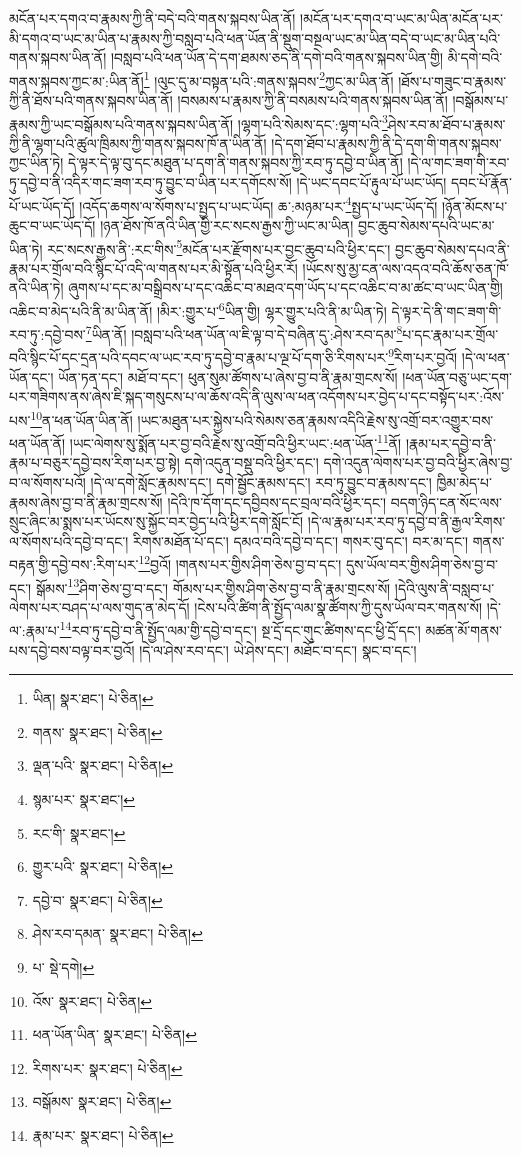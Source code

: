མངོན་པར་དགའ་བ་རྣམས་ཀྱི་ནི་བདེ་བའི་གནས་སྐབས་ཡིན་ནོ། །མངོན་པར་དགའ་བ་ཡང་མ་ཡིན་མངོན་པར་མི་དགའ་བ་ཡང་མ་ཡིན་པ་རྣམས་ཀྱི་བསླབ་པའི་ཕན་ཡོན་ནི་སྡུག་བསྔལ་ཡང་མ་ཡིན་བདེ་བ་ཡང་མ་ཡིན་པའི་གནས་སྐབས་ཡིན་ནོ། །བསླབ་པའི་ཕན་ཡོན་དེ་དག་ཐམས་ཅད་ནི་དགེ་བའི་གནས་སྐབས་ཡིན་གྱི། མི་དགེ་བའི་གནས་སྐབས་ཀྱང་མ་:ཡིན་ནོ།\footnote{ཡིན།  སྣར་ཐང་།  པེ་ཅིན། } །ལུང་དུ་མ་བསྟན་པའི་:གནས་སྐབས་\footnote{གནས་  སྣར་ཐང་།  པེ་ཅིན། }ཀྱང་མ་ཡིན་ནོ། །ཐོས་པ་གཟུང་བ་རྣམས་ཀྱི་ནི་ཐོས་པའི་གནས་སྐབས་ཡིན་ནོ། །བསམས་པ་རྣམས་ཀྱི་ནི་བསམས་པའི་གནས་སྐབས་ཡིན་ནོ། །བསྒོམས་པ་རྣམས་ཀྱི་ཡང་བསྒོམས་པའི་གནས་སྐབས་ཡིན་ནོ། །ལྷག་པའི་སེམས་དང་:ལྷག་པའི་\footnote{ལྡན་པའི་  སྣར་ཐང་།  པེ་ཅིན། }ཤེས་རབ་མ་ཐོབ་པ་རྣམས་ཀྱི་ནི་ལྷག་པའི་ཚུལ་ཁྲིམས་ཀྱི་གནས་སྐབས་ཁོ་ན་ཡིན་ནོ། །དེ་དག་ཐོབ་པ་རྣམས་ཀྱི་ནི་དེ་དག་གི་གནས་སྐབས་ཀྱང་ཡིན་ཏེ། དེ་ལྟར་དེ་ལྟ་བུ་དང་མཐུན་པ་དག་ནི་གནས་སྐབས་ཀྱི་རབ་ཏུ་དབྱེ་བ་ཡིན་ནོ། །དེ་ལ་གང་ཟག་གི་རབ་ཏུ་དབྱེ་བ་ནི་འདིར་གང་ཟག་རབ་ཏུ་བྱུང་བ་ཡིན་པར་དགོངས་སོ། །དེ་ཡང་དབང་པོ་རྟུལ་པོ་ཡང་ཡོད། དབང་པོ་རྣོན་པོ་ཡང་ཡོད་དོ། །འདོད་ཆགས་ལ་སོགས་པ་སྤྱད་པ་ཡང་ཡོད། ཆ་:མཉམ་པར་\footnote{སྙམ་པར་  སྣར་ཐང་། }སྤྱད་པ་ཡང་ཡོད་དོ། །ཉོན་མོངས་པ་ཆུང་བ་ཡང་ཡོད་དོ། །ཉན་ཐོས་ཁོ་ནའི་ཡིན་གྱི་རང་སངས་རྒྱས་ཀྱི་ཡང་མ་ཡིན། བྱང་ཆུབ་སེམས་དཔའི་ཡང་མ་ཡིན་ཏེ། རང་སངས་རྒྱས་ནི་:རང་གིས་\footnote{རང་གི་  སྣར་ཐང་། }མངོན་པར་རྫོགས་པར་བྱང་ཆུབ་པའི་ཕྱིར་དང་། བྱང་ཆུབ་སེམས་དཔའ་ནི་རྣམ་པར་གྲོལ་བའི་སྙིང་པོ་འདི་ལ་གནས་པར་མི་སྟོན་པའི་ཕྱིར་རོ། །ཡོངས་སུ་མྱ་ངན་ལས་འདའ་བའི་ཆོས་ཅན་ཁོ་ནའི་ཡིན་ཏེ། ཞུགས་པ་དང་མ་བསྒྲིབས་པ་དང་འཆིང་བ་མཐའ་དག་ཡོད་པ་དང་འཆིང་བ་མ་ཚང་བ་ཡང་ཡིན་གྱི། འཆིང་བ་མེད་པའི་ནི་མ་ཡིན་ནོ། །མིར་:གྱུར་པ་\footnote{གྱུར་པའི་  སྣར་ཐང་།  པེ་ཅིན། }ཡིན་གྱི། ལྷར་གྱུར་པའི་ནི་མ་ཡིན་ཏེ། དེ་ལྟར་དེ་ནི་གང་ཟག་གི་རབ་ཏུ་:དབྱེ་བས་\footnote{དབྱེ་བ་  སྣར་ཐང་།  པེ་ཅིན། }ཡིན་ནོ། །བསླབ་པའི་ཕན་ཡོན་ལ་ཇི་ལྟ་བ་དེ་བཞིན་དུ་:ཤེས་རབ་དམ་\footnote{ཤེས་རབ་དམན་  སྣར་ཐང་།  པེ་ཅིན། }པ་དང་རྣམ་པར་གྲོལ་བའི་སྙིང་པོ་དང་དྲན་པའི་དབང་ལ་ཡང་རབ་ཏུ་དབྱེ་བ་རྣམ་པ་ལྔ་པོ་དག་ཅི་རིགས་པར་\footnote{པ་  སྡེ་དགེ། }རིག་པར་བྱའོ། །དེ་ལ་ཕན་ཡོན་དང་། ཡོན་ཏན་དང་། མཐོ་བ་དང་། ཕུན་སུམ་ཚོགས་པ་ཞེས་བྱ་བ་ནི་རྣམ་གྲངས་སོ། །ཕན་ཡོན་བཅུ་ཡང་དག་པར་གཟིགས་ནས་ཞེས་ཇི་སྐད་གསུངས་པ་ལ་ཆོས་འདི་ནི་ལུས་ལ་ཕན་འདོགས་པར་བྱེད་པ་དང་བསྟོད་པར་:འོས་པས་\footnote{འོས་  སྣར་ཐང་།  པེ་ཅིན། }ན་ཕན་ཡོན་ཡིན་ནོ། །ཡང་མཐུན་པར་སྐྱེས་པའི་སེམས་ཅན་རྣམས་འདིའི་རྗེས་སུ་འགྲོ་བར་འགྱུར་བས་ཕན་ཡོན་ནོ། །ཡང་ལེགས་སུ་སྨོན་པར་བྱ་བའི་རྗེས་སུ་འགྲོ་བའི་ཕྱིར་ཡང་:ཕན་ཡོན་\footnote{ཕན་ཡོན་ཡིན་  སྣར་ཐང་།  པེ་ཅིན། }ནོ། །རྣམ་པར་དབྱེ་བ་ནི་རྣམ་པ་བཅུར་དབྱེ་བས་རིག་པར་བྱ་སྟེ། དགེ་འདུན་བསྡུ་བའི་ཕྱིར་དང་། དགེ་འདུན་ལེགས་པར་བྱ་བའི་ཕྱིར་ཞེས་བྱ་བ་ལ་སོགས་པའོ། །དེ་ལ་དགེ་སློང་རྣམས་དང་། དགེ་སྦྱོང་རྣམས་དང་། རབ་ཏུ་བྱུང་བ་རྣམས་དང་། ཁྱིམ་མེད་པ་རྣམས་ཞེས་བྱ་བ་ནི་རྣམ་གྲངས་སོ། །དེའི་ཁ་དོག་དང་དབྱིབས་དང་བྲལ་བའི་ཕྱིར་དང་། བདག་ཉིད་ངན་སོང་ལས་སྲུང་ཞིང་མ་སྨས་པར་ཡོངས་སུ་སྐྱོང་བར་བྱེད་པའི་ཕྱིར་དགེ་སློང་ངོ། །དེ་ལ་རྣམ་པར་རབ་ཏུ་དབྱེ་བ་ནི་རྒྱལ་རིགས་ལ་སོགས་པའི་དབྱེ་བ་དང་། རིགས་མཐོན་པོ་དང་། དམའ་བའི་དབྱེ་བ་དང་། གསར་བུ་དང་། བར་མ་དང་། གནས་བརྟན་གྱི་དབྱེ་བས་:རིག་པར་\footnote{རིགས་པར་  སྣར་ཐང་།  པེ་ཅིན། }བྱའོ། །གནས་པར་གྱིས་ཤིག་ཅེས་བྱ་བ་དང་། དུས་ཡོལ་བར་གྱིས་ཤིག་ཅེས་བྱ་བ་དང་། སྒོམས་\footnote{བསྒོམས་  སྣར་ཐང་།  པེ་ཅིན། }ཤིག་ཅེས་བྱ་བ་དང་། གོམས་པར་གྱིས་ཤིག་ཅེས་བྱ་བ་ནི་རྣམ་གྲངས་སོ། །དེའི་ལུས་ནི་བསླབ་པ་ལེགས་པར་བཤད་པ་ལས་གུད་ན་མེད་དོ། །ངེས་པའི་ཚིག་ནི་སྤྱོད་ལམ་སྣ་ཚོགས་ཀྱི་དུས་ཡོལ་བར་གནས་སོ། །དེ་ལ་:རྣམ་པ་\footnote{རྣམ་པར་  སྣར་ཐང་།  པེ་ཅིན། }རབ་ཏུ་དབྱེ་བ་ནི་སྤྱོད་ལམ་གྱི་དབྱེ་བ་དང་། སྔ་དྲོ་དང་གུང་ཚིགས་དང་ཕྱི་དྲོ་དང་། མཚན་མོ་གནས་པས་དབྱེ་བས་བལྟ་བར་བྱའོ། །དེ་ལ་ཤེས་རབ་དང་། ཡེ་ཤེས་དང་། མཐོང་བ་དང་། སྣང་བ་དང་། 